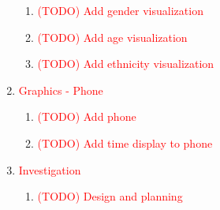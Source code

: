 \documentclass[a4paper, twoside]{article}
\begin{document}
\begin{enumerate}
\begin{enumerate}
		\item{} \textcolor{red}{(TODO) Add gender visualization}
		\item{} \textcolor{red}{(TODO) Add age visualization}
		\item{} \textcolor{red}{(TODO) Add ethnicity visualization}
	\end{enumerate}
	\item{} \textcolor{red}{Graphics - Phone} \begin{enumerate}
		\item{} \textcolor{red}{(TODO) Add phone}
		\item{} \textcolor{red}{(TODO) Add time display to phone}
	\end{enumerate}
	\item{} \textcolor{red}{Investigation} \begin{enumerate}
		\item{} \textcolor{red}{(TODO) Design and planning}
	\end{enumerate}
\end{enumerate}
\end{document}
